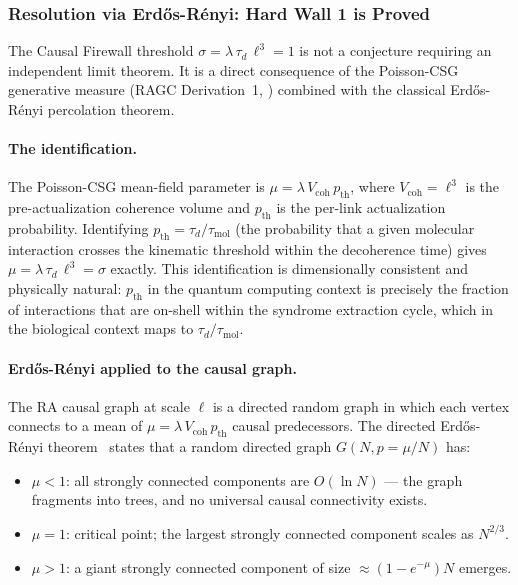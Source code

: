 \documentclass[11pt,a4paper]{article}
\theoremstyle{plain}
\theoremstyle{definition}
\theoremstyle{remark}
\begin{document}
\subsubsection{Resolution via Erd\H{o}s-R\'{e}nyi: Hard Wall 1 is Proved}
\label{sec:firewall_proof}

The Causal Firewall threshold $\sigma = \lambda\,\tau_d\,\ell^3 = 1$ is not a
conjecture requiring an independent limit theorem. It is a direct consequence
of the Poisson-CSG generative measure (RAGC Derivation~1, \citep{Sandeman2026b})
combined with the classical Erd\H{o}s-R\'{e}nyi percolation theorem.

\paragraph{The identification.}
The Poisson-CSG mean-field parameter is $\mu = \lambda\,V_{\mathrm{coh}}\,p_{\mathrm{th}}$,
where $V_{\mathrm{coh}} = \ell^3$ is the pre-actualization coherence volume and
$p_{\mathrm{th}}$ is the per-link actualization probability. Identifying
$p_{\mathrm{th}} = \tau_d/\tau_{\mathrm{mol}}$ (the probability that a given
molecular interaction crosses the kinematic threshold within the decoherence
time) gives $\mu = \lambda\,\tau_d\,\ell^3 = \sigma$ exactly.
This identification is dimensionally consistent and physically natural: $p_{\mathrm{th}}$
in the quantum computing context is precisely the fraction of interactions that
are on-shell within the syndrome extraction cycle, which in the biological context
maps to $\tau_d/\tau_{\mathrm{mol}}$.

\paragraph{Erd\H{o}s-R\'{e}nyi applied to the causal graph.}
The RA causal graph at scale $\ell$ is a directed random graph in which each
vertex connects to a mean of $\mu = \lambda\,V_{\mathrm{coh}}\,p_{\mathrm{th}}$
causal predecessors. The directed Erd\H{o}s-R\'{e}nyi theorem~\citep{ErdosRenyi1960}
states that a random directed graph $G(N, p = \mu/N)$ has:
\begin{itemize}[noitemsep]
  \item $\mu < 1$: all strongly connected components are $O(\ln N)$ --- the graph
  fragments into trees, and no universal causal connectivity exists.
  \item $\mu = 1$: critical point; the largest strongly connected component scales
  as $N^{2/3}$.
  \item $\mu > 1$: a giant strongly connected component of size
  ${\approx}(1 - e^{-\mu})N$ emerges.
\end{itemize}
\end{document}
